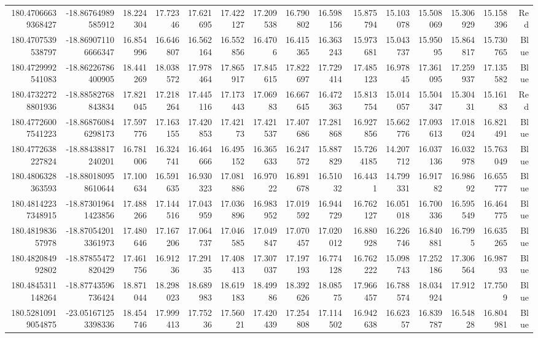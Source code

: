 \begin{center}
\begin{longtable}{rrrrrrrrrrrrrrr}
180.47066639368427 & -18.86764989585912 & 18.224304 & 17.72346 & 17.621695 & 17.422127 & 17.209538 & 16.790802 & 16.598156 & 15.875794 & 15.103078 & 15.508069 & 15.306929 & 15.158396 & Red \\
180.4707539538797 & -18.869071106666347 & 16.854996 & 16.646807 & 16.562164 & 16.552856 & 16.4706 & 16.415365 & 16.363243 & 15.973681 & 15.043737 & 15.95095 & 15.864817 & 15.730765 & Blue \\
180.4729992541083 & -18.86226786400905 & 18.441269 & 18.038572 & 17.978464 & 17.865917 & 17.845615 & 17.822697 & 17.729414 & 17.485123 & 16.97845 & 17.361095 & 17.259937 & 17.135582 & Blue \\
180.47322728801936 & -18.88582768843834 & 17.821045 & 17.218264 & 17.445116 & 17.173443 & 17.06983 & 16.667645 & 16.472363 & 15.813754 & 15.014057 & 15.504347 & 15.30431 & 15.16183 & Red \\
180.47726007541223 & -18.868760846298173 & 17.597776 & 17.163155 & 17.420853 & 17.42173 & 17.421537 & 17.407686 & 17.281868 & 16.927856 & 15.662776 & 17.093613 & 17.018024 & 16.821491 & Blue \\
180.4772638227824 & -18.88438817240201 & 16.781006 & 16.324741 & 16.464666 & 16.495152 & 16.365633 & 16.247572 & 15.887829 & 15.7264185 & 14.207712 & 16.037136 & 16.032978 & 15.763049 & Blue \\
180.4806328363593 & -18.880180958610644 & 17.100634 & 16.591635 & 16.930323 & 17.081886 & 16.97022 & 16.891678 & 16.51032 & 16.4431 & 14.799331 & 16.91782 & 16.98692 & 16.655777 & Blue \\
180.48142237348915 & -18.873019641423856 & 17.488266 & 17.144516 & 17.043959 & 17.036896 & 16.983952 & 17.019592 & 16.944729 & 16.762127 & 16.051018 & 16.700336 & 16.595549 & 16.464775 & Blue \\
180.481983657978 & -18.870542013361973 & 17.480646 & 17.167206 & 17.064737 & 17.046585 & 17.049847 & 17.070457 & 17.020012 & 16.880928 & 16.226746 & 16.840881 & 16.7995 & 16.635265 & Blue \\
180.482084992802 & -18.87855472820429 & 17.461756 & 16.91236 & 17.29135 & 17.408413 & 17.307037 & 17.197193 & 16.774128 & 16.762222 & 15.098743 & 17.252186 & 17.306564 & 16.98793 & Blue \\
180.4845311148264 & -18.87743596736424 & 18.871044 & 18.298023 & 18.689983 & 18.619183 & 18.49986 & 18.392626 & 18.08575 & 17.966457 & 16.788574 & 18.034924 & 17.912 & 17.7509 & Blue \\
180.52810919054875 & -23.051671253398336 & 18.454746 & 17.999413 & 17.75236 & 17.56021 & 17.420439 & 17.254808 & 17.114502 & 16.942638 & 16.62357 & 16.839787 & 16.54828 & 16.804981 & Blue \\

\end{longtable}
\end{center}
